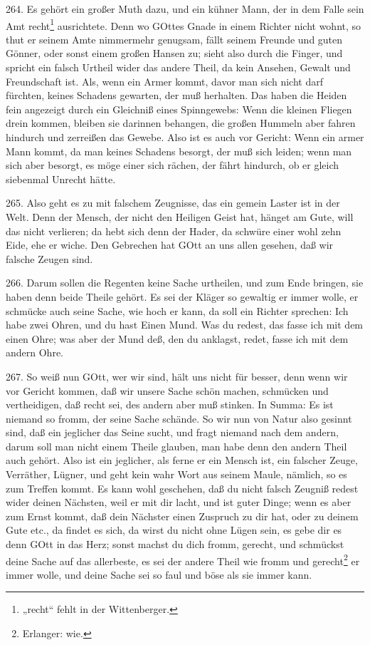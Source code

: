 264. Es gehört ein großer Muth dazu, und ein kühner Mann, der in dem Falle sein Amt recht\footnote{„recht“ fehlt in der Wittenberger.} ausrichtete. Denn wo GOttes Gnade in einem Richter nicht wohnt, so thut er seinem Amte nimmermehr genugsam, fällt seinem Freunde und guten Gönner, oder sonst einem großen Hansen zu; sieht also durch die Finger, und spricht ein falsch Urtheil wider das andere Theil, da kein Ansehen, Gewalt und Freundschaft ist. Als, wenn ein Armer kommt, davor man sich nicht darf fürchten, keines Schadens gewarten, der muß herhalten. Das haben die Heiden fein angezeigt durch ein Gleichniß eines Spinngewebs: Wenn die kleinen Fliegen drein kommen, bleiben sie darinnen behangen, die großen Hummeln aber fahren hindurch und zerreißen das Gewebe. Also ist es auch vor Gericht: Wenn ein armer Mann kommt, da man keines Schadens besorgt, der muß sich leiden; wenn man sich aber besorgt, es möge einer sich rächen, der fährt hindurch, ob er gleich siebenmal Unrecht hätte.

265. Also geht es zu mit falschem Zeugnisse, das ein gemein Laster ist in der Welt. Denn der Mensch, der nicht den Heiligen Geist hat, hänget am Gute, will das nicht verlieren; da hebt sich denn der Hader, da schwüre einer wohl zehn Eide, ehe er wiche. Den Gebrechen hat GOtt an uns allen gesehen, daß wir falsche Zeugen sind.

266. Darum sollen die Regenten keine Sache urtheilen, und zum Ende bringen, sie haben denn beide Theile gehört. Es sei der Kläger so gewaltig er immer wolle, er schmücke auch seine Sache, wie hoch er kann, da soll ein Richter sprechen: Ich habe zwei Ohren, und du hast Einen Mund. Was du redest, das fasse ich mit dem einen Ohre; was aber der Mund deß, den du anklagst, redet, fasse ich mit dem andern Ohre.

267. So weiß nun GOtt, wer wir sind, hält uns nicht für besser, denn wenn wir vor Gericht kommen, daß wir unsere Sache schön machen, schmücken und vertheidigen, daß recht sei, des andern aber muß stinken. In Summa: Es ist niemand so fromm, der seine Sache schände. So wir nun von Natur also gesinnt sind, daß ein jeglicher das Seine sucht, und fragt niemand nach dem andern, darum soll man nicht einem Theile glauben, man habe denn den andern Theil auch gehört. Also ist ein jeglicher, als ferne er ein Mensch ist, ein falscher Zeuge, Verräther, Lügner, und geht kein wahr Wort aus seinem Maule, nämlich, so es zum Treffen kommt. Es kann wohl geschehen, daß du nicht falsch Zeugniß redest wider deinen Nächsten, weil er mit dir lacht, und ist guter Dinge; wenn es aber zum Ernst kommt, daß dein Nächster einen Zuspruch zu dir hat, oder zu deinem Gute etc., da findet es sich, da wirst du nicht ohne Lügen sein, es gebe dir es denn GOtt in das Herz; sonst machst du dich fromm, gerecht, und schmückst deine Sache auf das allerbeste, es sei der andere Theil wie fromm und gerecht\footnote{Erlanger: wie.} er immer wolle, und deine Sache sei so faul und böse als sie immer kann.

